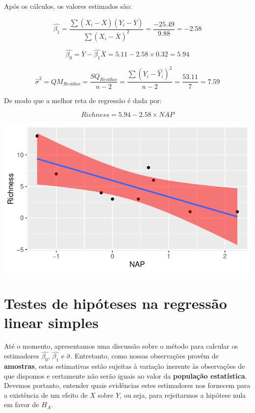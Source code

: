\documentclass[
]{book}
\begin{document}
Após os cálculos, os valores estimados são:

\[\hat{\beta_1} = \frac{\sum{(X_i - \overline{X})(Y_i - \overline{Y})}}{\sum{(X_i - \overline{X})^2}} = \frac{-25.49}{9.88} = -2.58\]

\[\hat{\beta_0} = \overline{Y} - \hat{\beta_1}\overline{X} = 5.11 -2.58 \times 0.32 = 5.94\]

\[\hat{\sigma}^2 = QM_{Resíduo} = \frac{SQ_{Resíduo}}{n-2} = \frac{\sum{(Y_i-\hat{Y_ i})^2}}{n-2} = \frac{53.11}{7} = 7.59\]

De modo que a melhor reta de regressão é dada por:

\[Richness = 5.94 -2.58 \times NAP\]

\begin{center}\includegraphics{probest-cambientais_files/figure-latex/unnamed-chunk-156-1} \end{center}

\hypertarget{testes-de-hipuxf3teses-na-regressuxe3o-linear-simples}{%
\section{Testes de hipóteses na regressão linear simples}\label{testes-de-hipuxf3teses-na-regressuxe3o-linear-simples}}

Até o momento, apresentamos uma discussão sobre o método para calcular os estimadores \(\hat{\beta_0}\), \(\hat{\beta_1}\) e \(\hat{\sigma}\). Entretanto, como nossas observações provêm de \textbf{amostras}, estas estimativas estão sujeitas à variação inerente às observações de que dispomos e certamente não serão iguais ao valor da \textbf{população estatística}. Devemos portanto, entender quais evidências estes estimadores nos fornecem para a existência de um efeito de \(X\) sobre \(Y\), ou seja, para rejeitarmos a hipótese nula em favor de \(H_A\).
\end{document}
